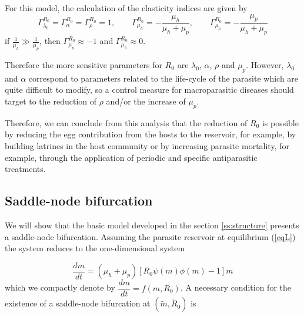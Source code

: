 \documentclass[12pt,a4paper]{article}
\theoremstyle{plain}%
\theoremstyle{definition}
\theoremstyle{remark}
\begin{document}
		For this model, the calculation of the elasticity indices are given by	
		\begin{equation}
		\Gamma^{R_0}_{\lambda_0}=\Gamma^{R_0}_{\alpha}=\Gamma^{R_0}_{\rho}=1, 
		\qquad \Gamma^{R_0}_{\mu_h}=-\dfrac{\mu_h}{\mu_{h}+\mu_p},
		\qquad \Gamma^{R_0}_{\mu_p}=-\dfrac{\mu_p}{\mu_{h}+\mu_p}
		\end{equation}
		if $\frac{1}{\mu_h} \gg \frac{1}{\mu_p}$, then $\Gamma^{R_0}_{\mu_p}\approx -1$
		and 
		$\Gamma^{R_0}_{\mu_h}\approx 0$.
		
		Therefore the more sensitive parameters for $R_0$ are $\lambda_0$, $\alpha$, $\rho$ and $\mu_p$.
		However, $\lambda_0$ and $\alpha$ correspond to parameters related to the life-cycle of the parasite which are quite difficult to modify, so a control measure for macroparasitic diseases should target to the reduction of $\rho$ and/or the increase of $\mu_p$.
		
		Therefore, we can conclude from this analysis that the reduction of $R_0$ 
		is possible by reducing the egg contribution from the hosts to the reservoir, for example, by building latrines in the host community or by increasing parasite mortality, for example, through the application of periodic and specific antiparasitic treatments.
		
		
\subsection{Saddle-node bifurcation}\label{bifurcacion}
We will show that the basic model developed in the section \ref{ss:structure} presents a saddle-node bifurcation. Assuming the parasite reservoir at equilibrium (\ref{eqL})  the system reduces to the one-dimensional system 

\begin{equation*}
\dfrac{dm}{dt}=(\mu_h + \mu_p)\left[ R_0  \psi(m)\phi(m) -1 \right] m%
\end{equation*}
which we compactly denote by
$\dfrac{dm}{dt}=f(m,R_0)$.
A necessary condition for the existence of a saddle-node bifurcation at 
$(\tilde m,\tilde R_0)$ is
\end{document}
